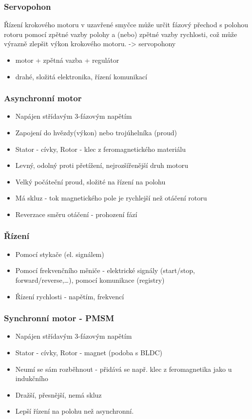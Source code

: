 \subsubsection*{Servopohon}
Řízení krokového motoru v uzavřené smyčce může určit fázový přechod s polohou rotoru pomocí zpětné vazby polohy a (nebo) zpětné vazby rychlosti, což může výrazně zlepšit výkon krokového motoru. -> servopohony
\begin{itemize}
    \item motor + zpětná vazba + regulátor
    \item drahé, složitá elektronika, řízení komunikací
\end{itemize}

\subsubsection*{Asynchronní motor}
\begin{itemize}
    \item Napájen střídavým 3-fázovým napětím
    \item Zapojení do hvězdy(výkon) nebo trojúhelníka (proud)
    \item Stator - cívky, Rotor - klec z feromagnetického materiálu
    \item Levný, odolný proti přetížení, nejrozšířenější druh motoru
    \item Velký počáteční proud, složité na řízení na polohu
    \item Má skluz - tok magnetického pole je rychlejší než otáčení rotoru
    \item Reverzace směru otáčení - prohození fází
\end{itemize}

\subsubsection*{Řízení}
\begin{itemize}
    \item Pomocí stykače (el. signálem)
    \item Pomocí frekvenčního měniče - elektrické signály (start/stop, forward/reverse,\dots), pomocí komunikace (registry)
    \item Řízení rychlosti - napětím, frekvencí
\end{itemize}

\subsubsection*{Synchronní motor - PMSM}
\begin{itemize}
    \item Napájen střídavým 3-fázovým napětím
    \item Stator - cívky, Rotor - magnet (podoba s BLDC)
    \item Neumí se sám rozběhnout - přidává se např. klec z feromagnetika jako u indukčního
    \item Dražší, přesnější, nemá skluz
    \item Lepší řízení na polohu než asynchronní.
\end{itemize}

